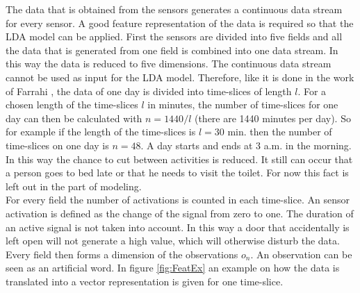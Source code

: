 The data that is obtained from the sensors generates a continuous data stream for every sensor. A good feature representation of the data is required so that the LDA model can be applied. First the sensors are divided into five fields and all the data that is generated from one field is combined into one data stream. In this way the data is reduced to five dimensions. 
The continuous data stream cannot be used as input for the LDA model. Therefore, like it is done in the work of Farrahi \cite{farrahi2008daily}, the data of one day is divided into time-slices of length $l$. For a chosen length of the time-slices $l$ in minutes, the number of time-slices for one day can then be calculated with $n=1440/l$ (there are 1440 minutes per day). So for example if the length of the time-slices is $l=30$ min. then the number of time-slices on one day is $n=48$. A day starts and ends at 3 a.m. in the morning. In this way the chance to cut between activities is reduced. It still can occur that a person goes to bed late or that he needs to visit the toilet. For now this fact is left out in the part of modeling.\\

For every field  the number of activations is counted in each time-slice. An sensor activation is defined as the change of the signal from zero  to one. The duration of an active signal is not taken into account. In this way a door that accidentally is left open will not generate a high value, which will otherwise disturb the data. Every field then forms a dimension of the observations $o_n$. An observation can be seen as an artificial word. In figure \ref{fig:FeatEx} an example on how the data is translated into a vector representation is given for one time-slice.\\

